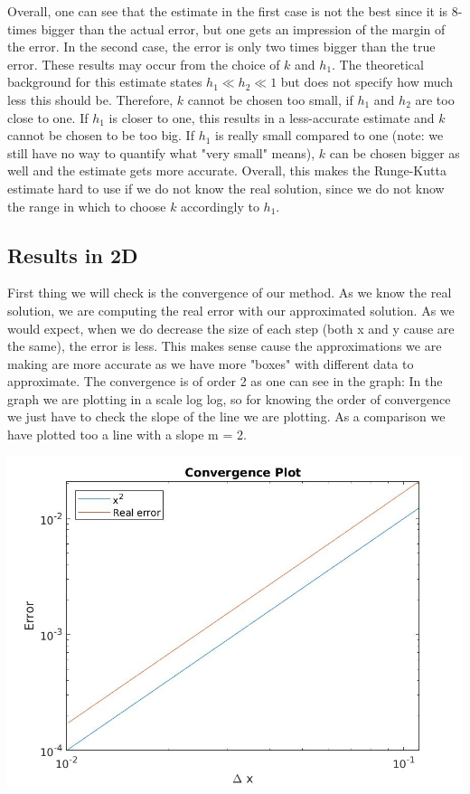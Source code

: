 \documentclass{article}
\begin{document}
	Overall, one can see that the estimate in the first case is not the best since it is 8-times bigger than the actual error, but one gets an impression of the margin of the error.
	In the second case, the error is only two times bigger than the true error.
	These results may occur from the choice of $k$ and $h_1$.
	The theoretical background for this estimate states $h_1 \ll h_2 \ll 1$ but does not specify how much less this should be. 
	Therefore, $k$ cannot be chosen too small, if $h_1$ and $h_2$ are too close to one. 
	If $h_1$ is closer to one, this results in a less-accurate estimate and $k$ cannot be chosen to be too big. 
	If $h_1$ is really small compared to one (note: we still have no way to quantify what "very small" means), $k$ can be chosen bigger as well and the estimate gets more accurate.
	Overall, this makes the Runge-Kutta estimate hard to use if we do not know the real solution, since we do not know the range in which to choose $k$ accordingly to $h_1$.
	
	
	\subsection*{Results in 2D}
	First thing we will check is the convergence of our method. As we know the real solution, we are computing the real error with our approximated solution. As we would expect, when we do decrease the size of each step (both x and y cause are the same), the error is less. This makes sense cause the approximations we are making are more accurate as we have more "boxes" with different data to approximate. The convergence is of order 2 as one can see in the graph:
	In the graph we are plotting in a scale log log, so for knowing the order of convergence we just have to check the slope of the line we are plotting. As a comparison we have plotted too a line with a slope m = 2.
	\begin{center}
		\includegraphics[width = 0.7\linewidth]{../Images/convergence2d.jpg}
	\end{center}
	
\end{document}
